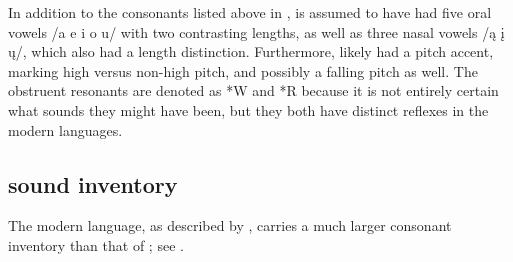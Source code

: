 \documentclass[output=paper]{LSP/langsci}
\begin{document}
In addition to the consonants listed above in ,  is assumed to have had five oral vowels /a e i o u/ with two contrasting lengths, as well as three nasal vowels /\k{a} \k{i} \k{u}/, which also had a length distinction. Furthermore,  likely had a pitch accent, marking high versus non-high pitch, and possibly a falling pitch as well. The obstruent resonants are denoted as *W and *R because it is not entirely certain what sounds they might have been, but they both have distinct reflexes in the modern languages.

\subsection{ sound inventory}

The modern  language, as described by \citet{Linn2000}, carries a much larger consonant inventory than that of ; see .
\end{document}

